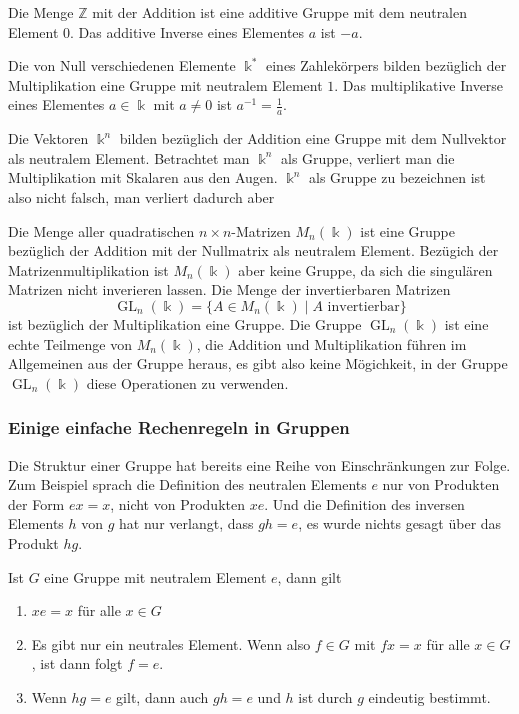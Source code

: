\begin{beispiel}
Die Menge $\mathbb{Z}$ mit der Addition ist eine additive Gruppe mit
dem neutralen Element $0$.
Das additive Inverse eines Elementes $a$ ist $-a$.
\end{beispiel}

\begin{beispiel}
Die von Null verschiedenen Elemente $\Bbbk^*$ eines Zahlekörpers bilden
bezüglich der Multiplikation eine Gruppe mit neutralem Element $1$.
Das multiplikative Inverse eines Elementes $a\in \Bbbk$ mit $a\ne 0$
ist $a^{-1}=\frac1{a}$.
\end{beispiel}

\begin{beispiel}
Die Vektoren $\Bbbk^n$ bilden bezüglich der Addition eine Gruppe mit
dem Nullvektor als neutralem Element.
Betrachtet man $\Bbbk^n$ als Gruppe, verliert man die Multiplikation
mit Skalaren aus den Augen.
$\Bbbk^n$ als Gruppe zu bezeichnen ist also nicht falsch, man
verliert dadurch aber 
\end{beispiel}

\begin{beispiel}
Die Menge aller quadratischen $n\times n$-Matrizen $M_n(\Bbbk)$ ist
eine Gruppe bezüglich der Addition mit der Nullmatrix als neutralem
Element.
Bezügich der Matrizenmultiplikation ist $M_n(\Bbbk)$ aber keine
Gruppe, da sich die singulären Matrizen nicht inverieren lassen.
Die Menge der invertierbaren Matrizen
\[
\operatorname{GL}_n(\Bbbk)
=
\{
A\in M_n(\Bbbk)\;|\; \text{$A$ invertierbar}
\}
\]
ist bezüglich der Multiplikation eine Gruppe.
Die Gruppe $\operatorname{GL}_n(\Bbbk)$ ist eine echte Teilmenge 
von $M_n(\Bbbk)$, die Addition und Multiplikation führen im Allgemeinen
aus der Gruppe heraus, es gibt also keine Mögichkeit, in der Gruppe
$\operatorname{GL}_n(\Bbbk)$ diese Operationen zu verwenden.
\end{beispiel}

\subsubsection{Einige einfache Rechenregeln in Gruppen}
Die Struktur einer Gruppe hat bereits eine Reihe von
Einschränkungen zur Folge.
Zum Beispiel sprach die Definition des neutralen Elements $e$ nur von
Produkten der Form $ex=x$, nicht von Produkten $xe$.
Und die Definition des inversen Elements $h$ von $g$ hat nur
verlangt, dass $gh=e$, es wurde nichts gesagt über das Produkt $hg$.

\begin{satz}
\label{buch:vektorenmatrizen:satz:gruppenregeln}
Ist $G$ eine Gruppe mit neutralem Element $e$, dann gilt
\begin{enumerate}
\item
$xe=x$ für alle $x\in G$
\item
Es gibt nur ein neutrales Element.
Wenn also $f\in G$ mit $fx=x$ für alle $x\in G$, ist dann folgt $f=e$.
\item 
Wenn $hg=e$ gilt, dann auch $gh=e$ und $h$ ist durch $g$ eindeutig bestimmt.
\end{enumerate}
\end{satz}

